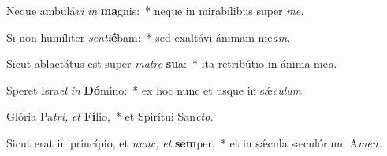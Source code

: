 \item Neque ambulá\textit{vi} \textit{in} \textbf{ma}gnis:~* neque in mirabílibus super \textit{me.}
\item Si non humíliter \textit{senti}\textbf{é}bam:~* sed exaltávi ánimam me\hspace*{0.03em}\textit{am.}
\item Sicut ablactátus est super \textit{matre} \textbf{su}a:~* ita retribútio in ánima me\hspace*{0.03em}\textit{a.}
\item Speret Isra\hspace*{0.03em}\textit{el} \textit{in} \textbf{Dó}mino:~* ex hoc nunc et usque in sǽ\hspace*{0.03em}\textit{culum.}
\item Glória Pa\hspace*{0.03em}\textit{tri,} \textit{et} \textbf{Fí}lio,~* et Spirítui San\hspace*{0.03em}\textit{cto.}
\item Sicut erat in princípio, et \textit{nunc,} \textit{et} \textbf{sem}per,~* et in sǽcula sæculórum. A\textit{men.}
